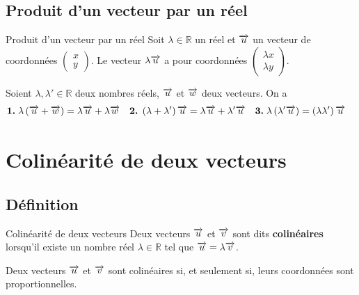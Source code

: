 \documentclass[11pt]{article}
\begin{document}
\subsection{Produit d'un vecteur par un réel}
\begin{defi}{Produit d'un vecteur par un réel}
  Soit $\lambda\in\mathbb{R}$ un réel et $\overrightarrow{u}$ un vecteur de coordonnées
  $\begin{pmatrix}x\\y\end{pmatrix}$. Le vecteur $\lambda\overrightarrow{u}$ a pour
  coordonnées $\begin{pmatrix}\lambda x \\ \lambda y \end{pmatrix}$.
\end{defi}
\begin{prop}
  Soient $\lambda, \lambda'\in\mathbb{R}$ deux nombres réels, $\overrightarrow{u}$ et $\overrightarrow{w}$ deux vecteurs. On a
  \begin{align*}
    \textbf{1.}\;& \lambda\left( \overrightarrow{u} +\overrightarrow{w} \right) = \lambda\overrightarrow{u}+\lambda\overrightarrow{w} &
    \textbf{2.}\;& \left( \lambda+\lambda' \right)\overrightarrow{u} = \lambda\overrightarrow{u}+\lambda'\overrightarrow{u} &
    \textbf{3.}\;& \lambda\left( \lambda'\overrightarrow{u}\right) = \left( \lambda\lambda'
    \right)\overrightarrow{u}
  \end{align*}
\end{prop}

\section{Colinéarité de deux vecteurs}
\subsection{Définition}
\begin{defi}{Colinéarité de deux vecteurs}
  Deux vecteurs $\overrightarrow{u}$ et $\overrightarrow{v}$ sont dits \textbf{colinéaires}
  lorsqu'il existe un nombre réel $\lambda\in\mathbb{R}$ tel que $\overrightarrow{u}=\lambda\overrightarrow{v}$.
\end{defi}
\begin{prop}
  Deux vecteurs $\overrightarrow{u}$ et $\overrightarrow{v}$ sont colinéaires si, et seulement si,
  leurs coordonnées sont proportionnelles.
\end{prop}
\end{document}
